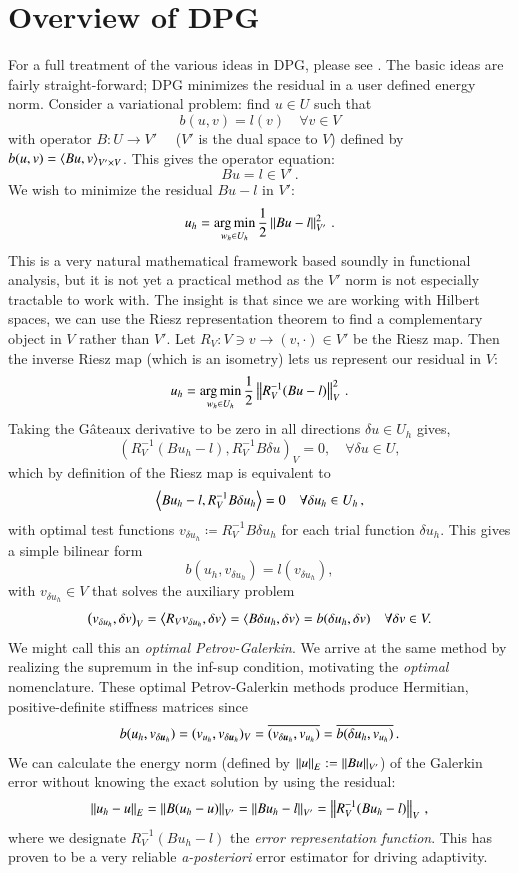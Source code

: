 \documentclass[preprint,12pt]{elsarticle}
\begin{document}
\section{Overview of DPG}
For a full treatment of the various ideas in DPG, please see \cite{DPGOverview2}.
The basic ideas are fairly straight-forward; DPG minimizes the residual in a user defined energy norm.
Consider a variational problem: find $u\in U$ such that
\[
b(u,v)=l(v) \quad\forall v\in V
\]
with operator $B:U\rightarrow V'\quad$ ($V'$ is the dual space to $V$) defined by $b(u,v)=\left\langle Bu,v \right\rangle_{V'\times V}$.
This gives the operator equation:
\[
Bu=l\in V'\,.
\]
We wish to minimize the residual $Bu-l$ in $V'$:
\[
u_h=\operatorname*{arg\,min}_{w_h\in U_h}\frac{1}{2}\left\| Bu-l \right\|^2_{V'}\,.
\]
This is a very natural mathematical framework based soundly in functional analysis, but it is not yet a practical method as the $V'$ norm is not
especially tractable to work with.
The insight is that since we are working with Hilbert spaces, we can use the Riesz representation theorem to find a complementary object 
in $V$ rather than $V'$. Let $R_V:V\ni v\rightarrow(v,\cdot)\in V'$ be the Riesz map. 
Then the inverse Riesz map (which is an isometry) lets us represent our residual in $V$:
\[
u_h=\operatorname*{arg\,min}_{w_h\in U_h}\frac{1}{2}\left\| R_V^{-1}(Bu-l) \right\|^2_{V}\,.
\]
Taking the G\^ateaux derivative to be zero in all directions $\delta u \in
U_h$ gives,
\[
\left(R_V^{-1}(Bu_h-l),R_V^{-1}B\delta u\right)_V = 0, \quad \forall \delta u \in U,
\]
which by definition of the Riesz map is equivalent to 
\begin{equation*}
\left\langle Bu_h-l,R_V^{-1}B\delta u_h \right\rangle=0\quad\forall\delta u_h\in U_h\,,
\end{equation*}
with optimal test functions $v_{\delta u_h}\coloneqq R_V^{-1}B\delta u_h$ for each trial function $\delta u_h$.
This gives a simple bilinear form
\begin{equation*}
b(u_h,v_{\delta u_h})=l(v_{\delta u_h}),
\end{equation*}
with $v_{\delta u_h}\in V$ that solves the auxiliary problem
\begin{equation*}
\left( v_{\delta u_h},\delta v \right)_V=\left\langle R_Vv_{\delta u_h},\delta v \right\rangle
=\left\langle B\delta u_h,\delta v \right\rangle=b(\delta u_h,\delta v)\quad\forall\delta v\in V.
\end{equation*}
We might call this an \emph{optimal Petrov-Galerkin}.
We arrive at the same method by realizing the supremum in the inf-sup condition, motivating the \emph{optimal} nomenclature.
These optimal Petrov-Galerkin methods produce Hermitian, positive-definite stiffness matrices since
\[
b(u_h,v_{\delta\boldsymbol{u}_h})=(v_{u_h},v_{\delta\boldsymbol{u}_h})_V=\overline{(v_{\delta\boldsymbol{u}_h},v_{u_h})}=\overline{b(\delta u_h,v_{u_h})}\,.
\]
We can calculate the energy norm (defined by $\left\| u \right\|_E:=\left\| Bu \right\|_{V'}$) of the Galerkin error without knowing the exact solution by using the residual:
\[
\left\| u_h-u \right\|_E=\left\| B(u_h-u) \right\|_{V'}=\left\| Bu_h-l \right\|_{V'}=\left\| R_V^{-1}(Bu_h-l) \right\|_V\,,
\]
where we designate $R_V^{-1}(Bu_h-l)$ the \emph{error representation function}.
This has proven to be a very reliable \emph{a-posteriori} error estimator for driving adaptivity.
\end{document}

